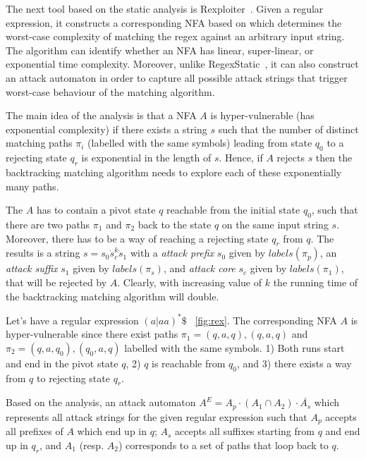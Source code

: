 \documentclass[acmsmall,screen]{acmart}
\begin{document}

The next tool based on the static analysis is  Rexploiter~\cite{rexploiter}. 
%
Given a regular expression, 
it constructs a corresponding NFA based on which determines the worst-case complexity of matching the regex
against an arbitrary input string.
%
The algorithm can identify whether an NFA has linear, super-linear, or exponential time complexity.
%
Moreover, unlike RegexStatic~\cite{weideman}, it can also construct an attack automaton in order to capture all possible attack strings 
that trigger worst-case behaviour of the matching algorithm.

The main idea of the analysis is that a NFA $A$ is hyper-vulnerable (has exponential complexity)
if there exists a string $s$ such that the number of distinct matching paths $\pi_i$ (labelled with the same symbols) leading from state $q_0$ to a rejecting
state $q_r$ is exponential in the length of $s$.
%
Hence, if $A$ rejects $s$ then the backtracking matching algorithm needs to explore each of these exponentially many paths.
%


The $A$ has to contain a pivot state $q$ reachable from the initial state $q_0$, such that there are two paths $\pi_1$ and $\pi_2$ back to the state $q$ 
on the same input string $s$.
%
Moreover, there has to be a way of reaching a rejecting state $q_r$ from $q$.
%
The results is a string $s = s_0 \dot s_c^k \dot s_1$ with a \emph{attack prefix} $s_0$ given by $labels(\pi_p)$, an \emph{attack suffix} $s_1$ given by $labels(\pi_s)$,
and \emph{attack core} $s_c$ given by $labels(\pi_1)$, that will be rejected by $A$.
%
Clearly, with increasing value of $k$ the running time of the backtracking matching algorithm will double.

\begin{example}
Let's have a regular expression $(a|aa)^*\$$ ~\cref{fig:rex}. The corresponding NFA $A$ is hyper-vulnerable since
there exist paths $\pi_1 = (q,a,q),(q,a,q)$ and $\pi_2 = (q,a,q_0),(q_0,a,q)$ labelled with the same symbols.
%
1) Both runs start and end in the pivot state $q$, 2) $q$ is reachable from $q_0$, and 3) there exists a way from $q$
to rejecting state $q_r$.
\end{example}

Based on the analysis, an attack automaton 
$A^{E} = A_p \cdot (A_1 \cap A_2) \cdot \overline{A_s}$
 which represents all attack strings for the given regular expression
such that $A_p$ accepts all prefixes of $A$ which end up in $q$; 
%
$A_s$ accepts all suffixes starting from $q$ and end up in $q_r$,
%
and $A_1$ (resp. $A_2$) corresponds to a set of paths that loop back to $q$.
\end{document}

